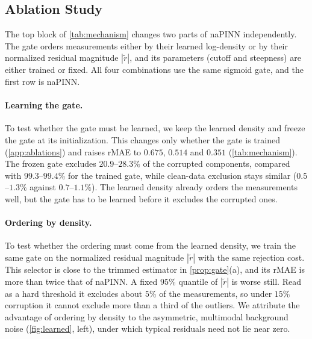\documentclass[twoside]{article}
\begin{document}
\subsection{Ablation Study}
\label{sec:mechanism}

The top block of \cref{tab:mechanism} changes two parts of naPINN
independently. The gate orders measurements either by their learned
log-density or by their normalized residual magnitude $|\tilde r|$, and its
parameters (cutoff and steepness) are either trained or fixed. All four
combinations use the same sigmoid gate, and the first row is naPINN.

\paragraph{Learning the gate.}
To test whether the gate must be learned, we keep the learned density and
freeze the gate at its initialization. This changes only whether the gate is
trained (\cref{app:ablations}) and raises rMAE to $0.675$, $0.514$ and $0.351$
(\cref{tab:mechanism}). The frozen
gate excludes $20.9$--$28.3\%$ of the corrupted components, compared with
$99.3$--$99.4\%$ for the trained gate, while clean-data exclusion stays similar
($0.5$--$1.3\%$ against $0.7$--$1.1\%$). The learned density already orders the
measurements well, but the gate has to be learned before it excludes the
corrupted ones.

\paragraph{Ordering by density.}
To test whether the ordering must come from the learned density, we train the
same gate on the normalized residual magnitude $|\tilde r|$ with the same
rejection cost. This selector is close to the trimmed estimator in
\cref{prop:gate}(a), and its rMAE is more than twice that of naPINN. A fixed $95\%$ quantile of $|\tilde r|$ is worse
still. Read as a hard threshold it excludes about $5\%$ of the measurements, so
under $15\%$ corruption it cannot exclude more than a third of the outliers. We attribute the advantage of
ordering by density to the asymmetric, multimodal background noise
(\cref{fig:learned}, left), under which typical residuals need not lie near zero.
\end{document}
